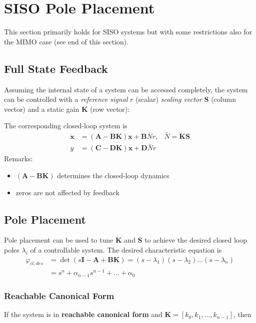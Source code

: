 \section{SISO Pole Placement}
This section primarily holds for SISO systems but with some restrictions also for the MIMO case (see end of this section).
\subsection{Full State Feedback}
Assuming the internal state of a system can be accessed completely, the system can be controlled
with a \textit{reference signal} $r$ (scalar) \textit{scaling vector} $\mathbf{S}$ (column vector) and a static gain $\mathbf{K}$ (row vector):
\begin{center}
    
\end{center}

The corresponding closed-loop system is
\noindent\begin{align*}
    \dot{\mathbf{x}} & =(\mathbf{A}-\mathbf{BK})\mathbf{x}+\mathbf{B}\bar{N}r, & \bar{N}=\mathbf{KS} \\
    y                & =(\mathbf{C}-\mathbf{DK})\mathbf{x} +\mathbf{D}\bar{N}r
\end{align*}
Remarks:
\begin{itemize}
    \item $(\mathbf{A}-\mathbf{BK})$ determines the closed-loop dynamics
    \item zeros are not affected by feedback
\end{itemize}

\subsection{Pole Placement}\label{sec:pole_placement}
Pole placement can be used to tune $\mathbf{K}$ and $\mathbf{S}$ to achieve the desired closed loop poles $\lambda_i$ of a controllable system.
The desired characteristic equation is
\noindent\begin{align*}
    \varphi_{cl,des} & =\det{(s\mathbf{I}-\mathbf{A}+\mathbf{BK})}=(s-\lambda_1)(s-\lambda_2)\ldots(s-\lambda_n) \\
                     & =s^n+\alpha_{n-1}s^{n-1}+\ldots+\alpha_0
\end{align*}

\subsubsection{Reachable Canonical Form}
If the system is in \textbf{reachable canonical form} and $\mathbf{K} = \left[k_0,k_1,\ldots,k_{n-1}\right]$, then

